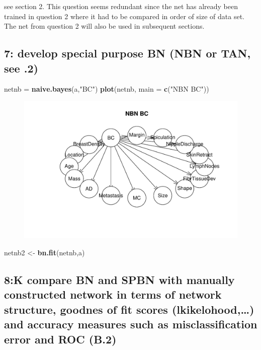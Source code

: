 \documentclass[]{article}
\newenvironment{Shaded}{\begin{snugshade}}{\end{snugshade}}
\newcommand{\KeywordTok}[1]{\textcolor[rgb]{0.13,0.29,0.53}{\textbf{{#1}}}}
\newcommand{\DataTypeTok}[1]{\textcolor[rgb]{0.13,0.29,0.53}{{#1}}}
\newcommand{\StringTok}[1]{\textcolor[rgb]{0.31,0.60,0.02}{{#1}}}
\newcommand{\NormalTok}[1]{{#1}}
\begin{document}
see section 2. This question seems redundant since the net has already
been trained in question 2 where it had to be compared in order of size
of data set. The net from question 2 will also be used in subsequent
sections.

\subsection{7: develop special purpose BN (NBN or TAN, see
.2)}\label{develop-special-purpose-bn-nbn-or-tan-see-.2}

\begin{Shaded}
\begin{Highlighting}[]
\NormalTok{netnb =}\StringTok{ }\KeywordTok{naive.bayes}\NormalTok{(a,}\StringTok{"BC"}\NormalTok{)}
\KeywordTok{plot}\NormalTok{(netnb, }\DataTypeTok{main =} \KeywordTok{c}\NormalTok{(}\StringTok{"NBN BC"}\NormalTok{))}
\end{Highlighting}
\end{Shaded}

\begin{figure}[htbp]
\centering
\includegraphics{BN_Ass2_files/figure-latex/unnamed-chunk-9-1.pdf}
\end{figure}

\begin{Shaded}
\begin{Highlighting}[]
\NormalTok{netnb2 <-}\StringTok{ }\KeywordTok{bn.fit}\NormalTok{(netnb,a)}
\end{Highlighting}
\end{Shaded}

\subsection{8:K compare BN and SPBN with manually constructed network in
terms of network structure, goodnes of fit scores (lkikelohood,\ldots{})
and accuracy measures such as misclassification error and ROC
(B.2)}\label{k-compare-bn-and-spbn-with-manually-constructed-network-in-terms-of-network-structure-goodnes-of-fit-scores-lkikelohood-and-accuracy-measures-such-as-misclassification-error-and-roc-b.2}
\end{document}
